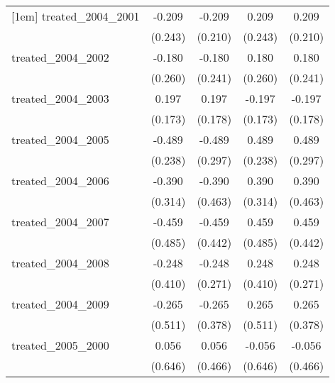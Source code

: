 {\begin{tabular}{l*{4}{c}}
[1em]
treated\_2004\_2001&      -0.209         &      -0.209         &       0.209         &       0.209         \\
            &     (0.243)         &     (0.210)         &     (0.243)         &     (0.210)         \\
[1em]
treated\_2004\_2002&      -0.180         &      -0.180         &       0.180         &       0.180         \\
            &     (0.260)         &     (0.241)         &     (0.260)         &     (0.241)         \\
[1em]
treated\_2004\_2003&       0.197         &       0.197         &      -0.197         &      -0.197         \\
            &     (0.173)         &     (0.178)         &     (0.173)         &     (0.178)         \\
[1em]
treated\_2004\_2005&      -0.489\sym{*}  &      -0.489         &       0.489\sym{*}  &       0.489         \\
            &     (0.238)         &     (0.297)         &     (0.238)         &     (0.297)         \\
[1em]
treated\_2004\_2006&      -0.390         &      -0.390         &       0.390         &       0.390         \\
            &     (0.314)         &     (0.463)         &     (0.314)         &     (0.463)         \\
[1em]
treated\_2004\_2007&      -0.459         &      -0.459         &       0.459         &       0.459         \\
            &     (0.485)         &     (0.442)         &     (0.485)         &     (0.442)         \\
[1em]
treated\_2004\_2008&      -0.248         &      -0.248         &       0.248         &       0.248         \\
            &     (0.410)         &     (0.271)         &     (0.410)         &     (0.271)         \\
[1em]
treated\_2004\_2009&      -0.265         &      -0.265         &       0.265         &       0.265         \\
            &     (0.511)         &     (0.378)         &     (0.511)         &     (0.378)         \\
[1em]
treated\_2005\_2000&       0.056         &       0.056         &      -0.056         &      -0.056         \\
            &     (0.646)         &     (0.466)         &     (0.646)         &     (0.466)         \\

\end{tabular}}
